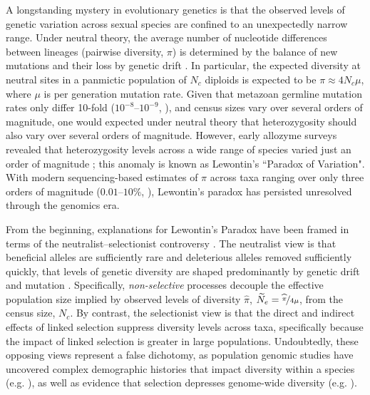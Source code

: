\documentclass[11pt]{article}
\begin{document}
A longstanding mystery in evolutionary genetics is that the observed levels of
genetic variation across sexual species are confined to an unexpectedly narrow
range. Under neutral theory, the average number of nucleotide differences
between lineages (pairwise diversity, $\pi$) is determined by the balance of
new mutations and their loss by genetic drift
\parencite{Kimura1964-ul,Malecot1948-zv,Wright1931-fl}. In particular, the
expected diversity at neutral sites in a panmictic population of $N_c$ diploids
is expected to be $\pi \approx 4N_c \mu$, where $\mu$ is per generation
mutation rate. Given that metazoan germline mutation rates only differ 10-fold
($10^{-8}$--$10^{-9}$, \cite{Kondrashov2010-fi,Lynch2010-ki}), and census sizes
vary over several orders of magnitude, one would expected under neutral theory
that heterozygosity should also vary over several orders of magnitude. However,
early allozyme surveys revealed that heterozygosity levels across a wide range
of species varied just an order of magnitude \parencite[][p.
208]{Lewontin1974-jb}; this anomaly is known as Lewontin's ``Paradox of
Variation". With modern sequencing-based estimates of $\pi$ across taxa ranging
over only three orders of magnitude ($0.01$--$10\%$, \cite{Leffler2012-zj}),
Lewontin's paradox has persisted unresolved through the genomics era.

From the beginning, explanations for Lewontin's Paradox have been framed in
terms of the neutralist--selectionist controversy
\parencite{Lewontin1974-jb,Kimura1984-ia,Gillespie1991-qa,Gillespie2001-mv}.
The neutralist view is that beneficial alleles are sufficiently rare and
deleterious alleles removed sufficiently quickly, that levels of genetic
diversity are shaped predominantly by genetic drift and mutation
\parencite{Kimura1984-ia}. Specifically, \emph{non-selective} processes
decouple the effective population size implied by observed levels of diversity
$\widehat{\pi}$, $\widetilde{N}_e = \nicefrac{\widehat{\pi}}{4\mu}$, from the
census size, $N_c$. By contrast, the selectionist view is that the direct and
indirect effects of linked selection suppress diversity levels across taxa,
specifically because the impact of linked selection is greater in large
populations. Undoubtedly, these opposing views represent a false dichotomy, as
population genomic studies have uncovered complex demographic histories that
impact diversity within a species (e.g. \cite{Zhao2013-vd,Palkopoulou2015-bg}),
as well as evidence that selection depresses genome-wide diversity (e.g.
\cite{Elyashiv2016-vt,Begun1992-ey,Aguade1989-jx,McVicker2009-ax}). 
\end{document}
